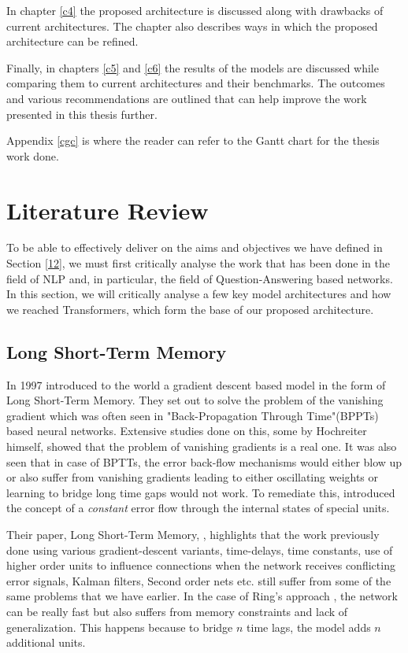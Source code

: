 \documentclass[a4paper,12pt]{report}
\begin{document}
        In chapter \ref{c4} the proposed architecture is discussed along with drawbacks of current architectures. The chapter also describes ways in which the proposed architecture can be refined.

        Finally, in chapters \ref{c5} and \ref{c6} the results of the models are discussed while comparing them to current architectures and their benchmarks. The outcomes and various recommendations are outlined that can help improve the work presented in this thesis further.

        Appendix \ref{cgc} is where the reader can refer to the Gantt chart for the thesis work done.

    \chapter{Literature Review}\label{c2litrev}

    To be able to effectively deliver on the aims and objectives we have defined in Section \ref{12}, we must first critically analyse the work that has been done in the field of NLP and, in particular, the field of Question-Answering based networks. In this section, we will critically analyse a few key model architectures and how we reached Transformers, which form the base of our proposed architecture.



        \section{Long Short-Term Memory}\label{22}

            In 1997 \citep{lstmoriginal} introduced to the world a gradient descent based model in the form of Long Short-Term Memory. They set out to solve the problem of the vanishing gradient which was often seen in "Back-Propagation Through Time"(BPPTs) based neural networks. Extensive studies done on this, some by Hochreiter himself, showed that the problem of vanishing gradients is a real one. It was also seen that in case of BPTTs, the error back-flow mechanisms would either blow up or also suffer from vanishing gradients leading to either oscillating weights or learning to bridge long time gaps would not work. To remediate this, \citep{lstmoriginal} introduced the concept of a \textit{constant} error flow through the internal states of special units.

            Their paper, Long Short-Term Memory, \citep{lstmoriginal}, highlights that the work previously done using various gradient-descent variants, time-delays, time constants, use of higher order units to influence connections when the network receives conflicting error signals, Kalman filters, Second order nets etc. still suffer from some of the same problems that we have earlier. In the case of Ring's approach \citep{lstmRing}, the network can be really fast but also suffers from memory constraints and lack of generalization. This happens because to bridge $ n $ time lags, the model adds $ n $ additional units.
\end{document}
